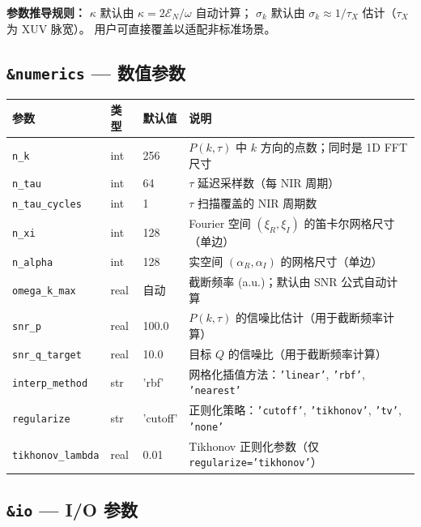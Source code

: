 \documentclass[11pt,a4paper]{ctexart}
\begin{document}
\begin{designbox}
\textbf{参数推导规则：} $\kappa$ 默认由 $\kappa = 2\mathcal{E}_N / \omega$ 自动计算；
$\sigma_k$ 默认由 $\sigma_k \approx 1/\tau_X$ 估计（$\tau_X$ 为 XUV 脉宽）。
用户可直接覆盖以适配非标准场景。
\end{designbox}

\subsection{\texttt{\&numerics} — 数值参数}

\begin{paramtable}
\begin{longtable}{p{2.8cm}p{1.5cm}p{2cm}p{5.5cm}}
\toprule
\textbf{参数} & \textbf{类型} & \textbf{默认值} & \textbf{说明} \\
\midrule
\texttt{n\_k}           & int  & 256    & $P(k,\tau)$ 中 $k$ 方向的点数；同时是 1D FFT 尺寸 \\
\texttt{n\_tau}         & int  & 64     & $\tau$ 延迟采样数（每 NIR 周期） \\
\texttt{n\_tau\_cycles} & int  & 1      & $\tau$ 扫描覆盖的 NIR 周期数 \\
\texttt{n\_xi}          & int  & 128    & Fourier 空间 $(\xi_R,\xi_I)$ 的笛卡尔网格尺寸（单边） \\
\texttt{n\_alpha}       & int  & 128    & 实空间 $(\alpha_R,\alpha_I)$ 的网格尺寸（单边） \\
\texttt{omega\_k\_max}  & real & 自动   & 截断频率 (a.u.)；默认由 SNR 公式自动计算 \\
\texttt{snr\_p}         & real & 100.0  & $P(k,\tau)$ 的信噪比估计（用于截断频率计算） \\
\texttt{snr\_q\_target} & real & 10.0   & 目标 $Q$ 的信噪比（用于截断频率计算） \\
\texttt{interp\_method} & str  & 'rbf'  & 网格化插值方法：\texttt{'linear'}, \texttt{'rbf'}, \texttt{'nearest'} \\
\texttt{regularize}     & str  & 'cutoff' & 正则化策略：\texttt{'cutoff'}, \texttt{'tikhonov'}, \texttt{'tv'}, \texttt{'none'} \\
\texttt{tikhonov\_lambda}& real& 0.01   & Tikhonov 正则化参数（仅 \texttt{regularize='tikhonov'}） \\
\bottomrule
\end{longtable}
\end{paramtable}

\subsection{\texttt{\&io} — I/O 参数}
\end{document}
